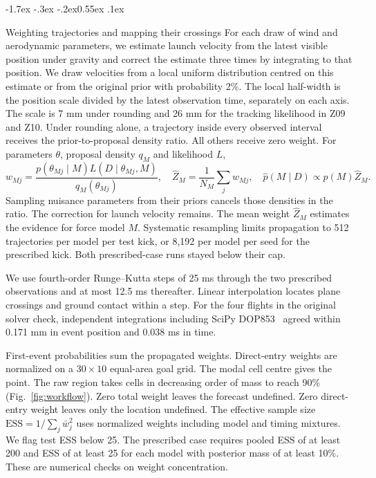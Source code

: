 \documentclass[11pt,letterpaper]{article}
\makeatletter
\renewcommand{\subsection}{\reserveheadroom\@startsection{subsection}{2}{\z@}
  {-1.7ex \@plus -.3ex \@minus -.2ex}{0.55ex \@plus .1ex}
  {\normalfont\normalsize\sffamily\bfseries\color{black}\raggedright}}
\newcommand{\reserveheadroom}{\par\ifdim\dimexpr\pagegoal-\pagetotal\relax<5\baselineskip\newpage\fi}
\makeatother
\begin{document}
\subsection{Weighting trajectories and mapping their crossings}
For each draw of wind and aerodynamic parameters, we estimate launch velocity from the latest visible position under gravity and correct the estimate three times by integrating to that position. We draw velocities from a local uniform distribution centred on this estimate or from the original prior with probability 2\%. The local half-width is the position scale divided by the latest observation time, separately on each axis. The scale is 7 mm under rounding and 26 mm for the tracking likelihood in Z09 and Z10. Under rounding alone, a trajectory inside every observed interval receives the prior-to-proposal density ratio. All others receive zero weight. For parameters \(\theta\), proposal density \(q_M\) and likelihood \(L\),
\begin{equation}
 w_{Mj}=\frac{p(\theta_{Mj}\mid M)L(D\mid\theta_{Mj},M)}{q_M(\theta_{Mj})},\quad
 \widehat Z_M=\frac1{N_M}\sum_jw_{Mj},\quad
 \widehat p(M\mid D)\propto p(M)\widehat Z_M.
 \label{eq:weights}
\end{equation}
Sampling nuisance parameters from their priors cancels those densities in the ratio. The correction for launch velocity remains. The mean weight \(\widehat Z_M\) estimates the evidence for force model \(M\). Systematic resampling limits propagation to 512 trajectories per model per test kick, or 8,192 per model per seed for the prescribed kick. Both prescribed-case runs stayed below their cap.

We use fourth-order Runge--Kutta steps of 25 ms through the two prescribed observations and at most 12.5 ms thereafter. Linear interpolation locates plane crossings and ground contact within a step. For the four flights in the original solver check, independent integrations including SciPy DOP853~\cite{scipy} agreed within 0.171 mm in event position and 0.038 ms in time.

First-event probabilities sum the propagated weights. Direct-entry weights are normalized on a \(30\times10\) equal-area goal grid. The modal cell centre gives the point. The raw region takes cells in decreasing order of mass to reach 90\% (Fig.~\ref{fig:workflow}). Zero total weight leaves the forecast undefined. Zero direct-entry weight leaves only the location undefined. The effective sample size \(\mathrm{ESS}=1/\sum_j\bar w_j^2\) uses normalized weights including model and timing mixtures. We flag test ESS below 25. The prescribed case requires pooled ESS of at least 200 and ESS of at least 25 for each model with posterior mass of at least 10\%. These are numerical checks on weight concentration.
\end{document}
